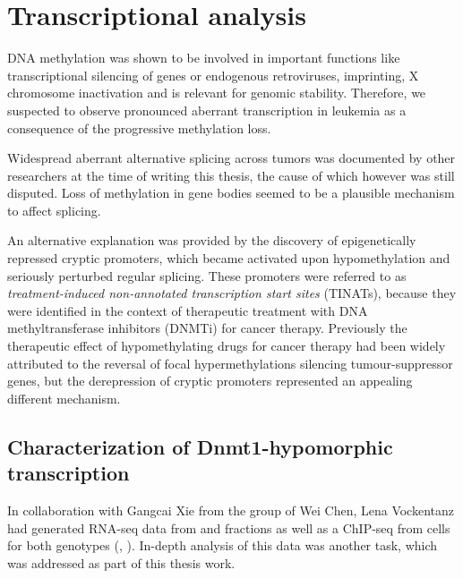 \chapter{Transcriptional analysis}
\label{chap:r:transcription}
\minitoc

DNA methylation was shown to be involved in important functions like transcriptional silencing of genes or endogenous retroviruses, imprinting, X chromosome inactivation and is relevant for genomic stability\cite{Goll2005,Schuebeler2015}. Therefore, we suspected to observe pronounced aberrant transcription in \dnmtchip \mllafnine leukemia as a consequence of the progressive methylation loss.

Widespread aberrant alternative splicing across tumors was documented by other researchers\cite{Kahles2018} at the time of writing this thesis, the cause of which however was still disputed. Loss of methylation in gene bodies seemed to be a plausible mechanism to affect splicing\cite{Mendizabal2017}.

An alternative explanation was provided by the discovery of epigenetically repressed cryptic promoters, which became activated upon hypomethylation and seriously perturbed regular splicing\cite{Brocks2017}. These promoters were referred to as \emph{treatment-induced non-annotated transcription start sites} (TINATs), because they were identified in the context of therapeutic treatment with DNA methyltransferase inhibitors (DNMTi) for cancer therapy. Previously the therapeutic effect of hypomethylating drugs for cancer therapy had been widely attributed to the reversal of focal hypermethylations silencing tumour-suppressor genes\cite{Cai2017}, but the derepression of cryptic promoters represented an appealing different mechanism.

\section{Characterization of Dnmt1-hypomorphic transcription}
\label{chap:r:transcription:intro}\label{chap:r:transcription:expressionoverall}\label{chap:r:transcription:genotypeval}

In collaboration with Gangcai Xie from the group of Wei Chen, Lena Vockentanz had generated RNA-seq data from \mllafnine \kithi and \kitlow fractions\cite{Krivtsov2006,Somervaille2006} as well as a \hisfourthree ChIP-seq from \kithi cells for both genotypes (\dnmtchip, \dnmtwt). In-depth analysis of this data was another task, which was addressed as part of this thesis work. 

